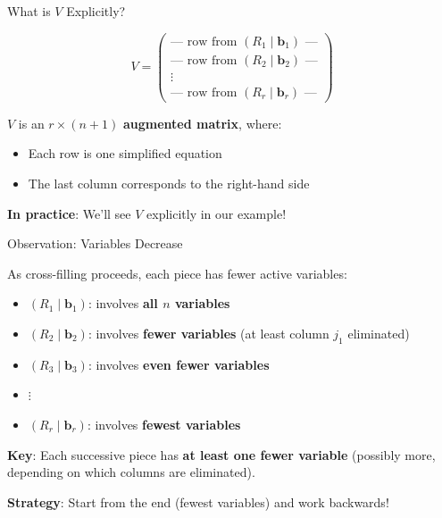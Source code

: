 \documentclass[10pt]{beamer}
\theoremstyle{definition}
\newcommand{\x}[1]{\alert{\textbf{#1}}}
\begin{document}
\begin{frame}{What is $V$ Explicitly?}

$$V = \begin{pmatrix}
\text{— row from } (R_1 \mid \mathbf{b}_1) \text{ —} \\
\text{— row from } (R_2 \mid \mathbf{b}_2) \text{ —} \\
\vdots \\
\text{— row from } (R_r \mid \mathbf{b}_r) \text{ —}
\end{pmatrix}$$

\vspace{0.5em}

$V$ is an $r \times (n+1)$ \x{augmented matrix}, where:
\begin{itemize}
\item Each row is one simplified equation
\item The last column corresponds to the right-hand side
\end{itemize}

\vspace{0.5em}

\x{In practice}: We'll see $V$ explicitly in our example!

\end{frame}

\begin{frame}{Observation: Variables Decrease}

As cross-filling proceeds, each piece has fewer active variables:

\begin{itemize}
\item $(R_1 \mid \mathbf{b}_1)$: involves \x{all $n$ variables}
\item $(R_2 \mid \mathbf{b}_2)$: involves \x{fewer variables} (at least column $j_1$ eliminated)
\item $(R_3 \mid \mathbf{b}_3)$: involves \x{even fewer variables}
\item $\vdots$
\item $(R_r \mid \mathbf{b}_r)$: involves \x{fewest variables}
\end{itemize}

\vspace{1em}

\x{Key}: Each successive piece has \textbf{at least one fewer variable} (possibly more, depending on which columns are eliminated).

\vspace{0.5em}

\x{Strategy}: Start from the end (fewest variables) and work backwards!

\end{frame}
\end{document}
